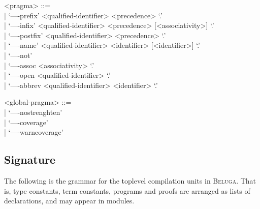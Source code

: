 \documentclass[11pt]{article}
\newcommand{\Beluga}{\textsc{Beluga}\xspace}
\begin{document}
\begin{grammar}
<pragma> ::= \hfill\\
| `----prefix' <qualified-identifier> <precedence> `.'\\
| `----infix' <qualified-identifier> <precedence> [<associativity>] `.'\\
| `----postfix' <qualified-identifier> <precedence> `.'\\
| `----name' <qualified-identifier> <identifier> [<identifier>] `.'\\
| `----not'\\
| `----assoc <associativity> `.'\\
| `----open <qualified-identifier> `.'\\
| `----abbrev <qualified-identifier> <identifier> `.'

<global-pragma> ::= \hfill\\
| `----nostrenghten'\\
| `----coverage'\\
| `----warncoverage'
\end{grammar}

\subsection{Signature}\label{section:syntax-signature}

The following is the grammar for the toplevel compilation units in \Beluga.
That is, type constants, term constants, programs and proofs are arranged as lists of declarations, and may appear in modules.
\end{document}
